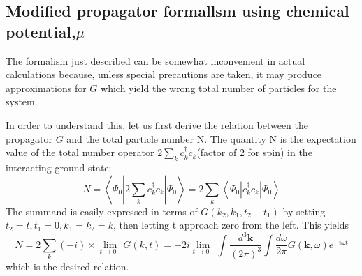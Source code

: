\subsection{Modified propagator formallsm using chemical potential,\texorpdfstring{$\mu$}{TEXT}}
The formalism just described can be somewhat inconvenient in actual calculations because, unless special precautions are taken, it may produce approximations for $G$ which yield the wrong total number of particles for the system.

In order to understand this, let us first derive the relation between the propagator $G$ and the total particle number N. The quantity N is the expectation value of the total number  operator $2\sum_k c^{\dagger}_k c_k$(factor of 2 for spin) in the interacting ground state:
\begin{equation}N=\left\langle\Psi_{0}\left|2 \sum_{k} c^{\dagger}_{k} c_{k}\right| \Psi_{0}\right\rangle=2 \sum_{k}\left\langle\Psi_{0}\left|c^{\dagger}_{k} c_{k}\right| \Psi_{0}\right\rangle\end{equation}
The summand is easily expressed in terms of $G(k_2,k_1,t_2-t_1)$ by setting $t_2=t,t_1=0,k_1=k_2=k$, then letting t approach zero from the left. This yields
\begin{equation}N=2 \sum_{k}(-i) \times \lim _{t \rightarrow 0^{-}} G(k, t)=-2 i \lim _{t \rightarrow 0^{-}} \int \frac{d^{3} \mathbf{k}}{(2 \pi)^{3}} \int \frac{d \omega}{2 \pi} G(\mathbf{k}, \omega) e^{-i \omega t}
\label{N-G-relation}
\end{equation}
which is the desired relation.

